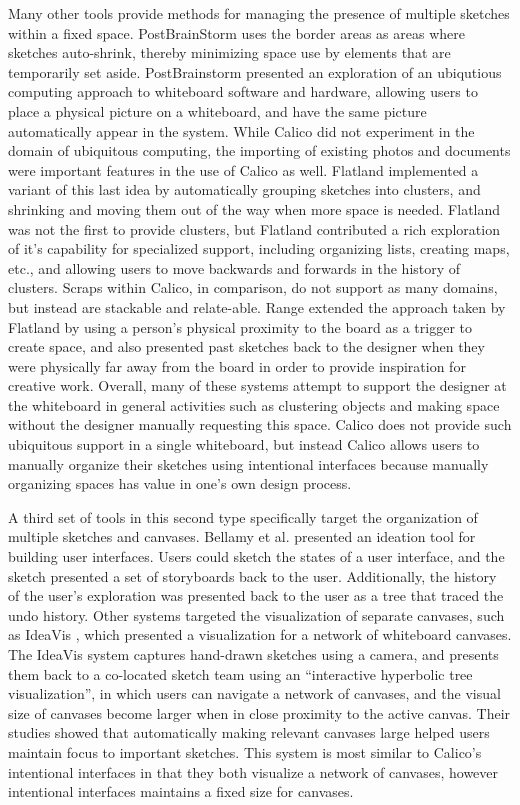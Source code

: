 Many other tools provide methods for managing the presence of multiple sketches within a fixed space. PostBrainStorm \citep{guimbretiere2001fluid} uses the border areas as areas where sketches auto-shrink, thereby minimizing space use by elements that are temporarily set aside. PostBrainstorm presented an exploration of an ubiqutious computing approach to whiteboard software and hardware, allowing users to place a physical picture on a whiteboard, and have the same picture automatically appear in the system. While Calico did not experiment in the domain of ubiquitous computing, the importing of existing photos and documents were important features in the use of Calico as well. Flatland \citep{mynatt1999flatland} implemented a variant of this last idea by automatically grouping sketches into clusters, and shrinking and moving them out of the way when more space is needed. Flatland was not the first to provide clusters, but Flatland contributed a rich exploration of it's capability for specialized support, including organizing lists, creating maps, etc., and allowing users to move backwards and forwards in the history of clusters. Scraps within Calico, in comparison, do not support as many domains, but instead are stackable and relate-able. Range \citep{Ju} extended the approach taken by Flatland by using a person's physical proximity to the board as a trigger to create space, and also presented past sketches back to the designer when they were physically far away from the board in order to provide inspiration for creative work. Overall, many of these systems attempt to support the designer at the whiteboard in general activities such as clustering objects and making space without the designer manually requesting this space. Calico does not provide such ubiquitous support in a single whiteboard, but instead Calico allows users to manually organize their sketches using intentional interfaces because manually organizing spaces has value in one's own design process.

A third set of tools in this second type specifically target the organization of multiple sketches and canvases. Bellamy et al. \cite{Bellamy:2011:STI:1985793.1985909} presented an ideation tool for building user interfaces. Users could sketch the states of a user interface, and the sketch presented a set of storyboards back to the user. Additionally, the history of the user's exploration was presented back to the user as a tree that traced the undo history. Other systems targeted the visualization of separate canvases, such as IdeaVis \cite{geyer2012ideavis}, which presented a visualization for a network of whiteboard canvases. The IdeaVis system captures hand-drawn sketches using a camera, and presents them back to a co-located sketch team using an ``interactive hyperbolic tree visualization'', in which users can navigate a network of canvases, and the visual size of canvases become larger when in close proximity to the active canvas. Their studies showed that automatically making relevant canvases large helped users maintain focus to important sketches. This system is most similar to Calico's intentional interfaces in that they both visualize a network of canvases, however intentional interfaces maintains a fixed size for canvases.

